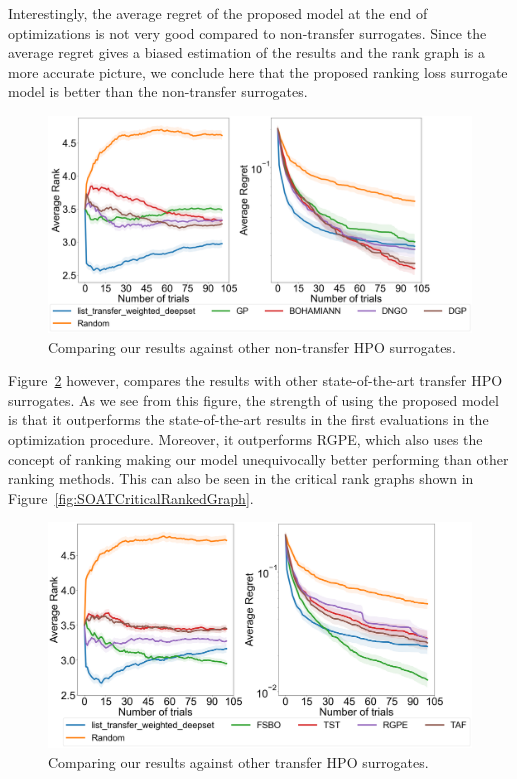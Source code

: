 \documentclass[12pt, twoside, ngerman]{report}
\begin{document}
Interestingly, the average regret of the proposed model at the end of optimizations is not very good compared to non-transfer surrogates.
Since the average regret gives a biased estimation of the results and the rank graph is a more accurate picture,  we conclude here that the proposed ranking loss surrogate model is better than the non-transfer surrogates.

\begin{figure}[h]
  \centering
    \includegraphics[scale=0.25]{images/NonTransferSOAT}
    \caption{Comparing our results against other non-transfer HPO surrogates.}
    \label{fig:NonTransferSOAT}
\end{figure}


Figure~\ref{fig:TransferSOAT} however, compares the results with other state-of-the-art transfer HPO surrogates. As we see from this figure, the strength of using the proposed model is that it outperforms the state-of-the-art results in the first evaluations in the optimization procedure. Moreover, it outperforms RGPE, which also uses the concept of ranking making our model unequivocally better performing than other ranking methods. This can also be seen in the critical rank graphs shown in Figure~\ref{fig:SOATCriticalRankedGraph}.

\begin{figure}[h]
  \centering
    \includegraphics[scale=0.25]{images/TransferSOAT}
    \caption{Comparing our results against other transfer HPO surrogates.}
    \label{fig:TransferSOAT}
\end{figure}
\end{document}
